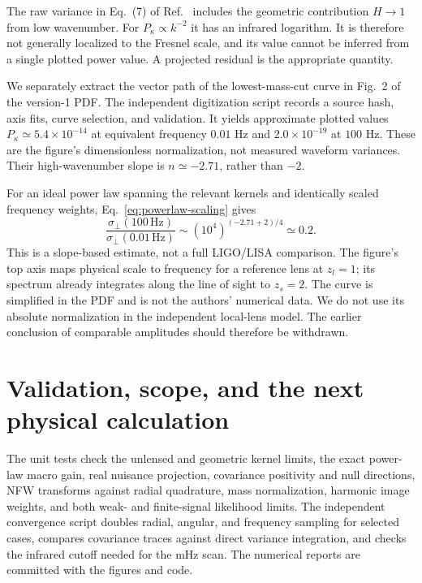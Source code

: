 \documentclass[11pt]{article}
\begin{document}
The raw variance in Eq.~(7) of Ref.~\cite{choi2026} includes the geometric
contribution $H\to1$ from low wavenumber. For $P_\kappa\propto k^{-2}$ it
has an infrared logarithm. It is therefore not generally localized to the
Fresnel scale, and its value cannot be inferred from a single plotted power
value. A projected residual is the appropriate quantity.

We separately extract the vector path of the lowest-mass-cut curve in Fig.~2
of the version-1 PDF. The independent digitization script records a source
hash, axis fits, curve selection, and validation. It yields approximate plotted
values $P_\kappa\simeq5.4\times10^{-14}$ at equivalent frequency $0.01$ Hz
and $2.0\times10^{-19}$ at $100$ Hz. These are the figure's dimensionless
normalization, not measured waveform variances. Their high-wavenumber slope is
$n\simeq-2.71$, rather than $-2$.

For an ideal power law spanning the relevant kernels and identically scaled
frequency weights, Eq.~\eqref{eq:powerlaw-scaling} gives
\begin{equation}
 \frac{\sigma_\perp(100\,\mathrm{Hz})}{\sigma_\perp(0.01\,\mathrm{Hz})}
 \sim(10^4)^{(-2.71+2)/4}\simeq0.2.
\end{equation}
This is a slope-based estimate, not a full LIGO/LISA comparison. The figure's
top axis maps physical scale to frequency for a reference lens at $z_l=1$;
its spectrum already integrates along the line of sight to $z_s=2$.
The curve is simplified in the PDF and is not the authors' numerical data.
We do not use its absolute normalization in the independent local-lens model.
The earlier conclusion of comparable amplitudes should therefore be withdrawn.

\section{Validation, scope, and the next physical calculation}

The unit tests check the unlensed and geometric kernel limits, the exact
power-law macro gain, real nuisance projection, covariance positivity and
null directions, NFW transforms against radial quadrature, mass normalization,
harmonic image weights, and both weak- and finite-signal likelihood limits.
The independent convergence script doubles radial, angular, and frequency
sampling for selected cases, compares covariance traces against direct
variance integration, and checks the infrared cutoff needed for the mHz scan.
The numerical reports are committed with the figures and code.
\end{document}
